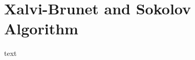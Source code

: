 \documentclass[../document.tex]{subfiles}
\begin{document}
\section{Xalvi-Brunet and Sokolov Algorithm}
text
\end{document}
